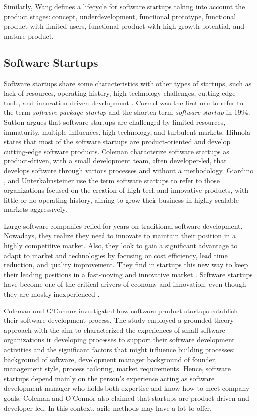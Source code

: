 \documentclass[runningheads]{llncs}
\begin{document}
Similarly, Wang \cite{wang2016key} defines a lifecycle for software startups taking into account the product stages: concept, underdevelopment, functional prototype, functional product with limited users, functional product with high growth potential, and mature product.

\subsection{Software Startups}

Software startups share some characteristics with other types of startups, such as lack of resources, operating history, high-technology challenges, cutting-edge tools, and innovation-driven development \cite{Unterkalmsteiner2016}. Carmel \cite{carmel1994time} was the first one to refer to the term \textit{software package startup} and the shorten term \textit{software startup} in 1994. Sutton \cite{sutton2000role} argues that software startups are challenged by limited resources, immaturity, multiple influences, high-technology, and turbulent markets. Hilmola \cite{hilmola2003value} states that most of the software startups are product-oriented and develop cutting-edge software products. Coleman \cite{coleman2008investigation} characterize software startups as product-driven, with a small development team, often developer-led, that develops software through various processes and without a methodology. Giardino \cite{Giardino2016}, and Unterkalmsteiner \cite{Unterkalmsteiner2016} use the term software startups to refer to those organizations focused on the creation of high-tech and innovative products, with little or no operating history, aiming to grow their business in highly-scalable markets aggressively. 

Large software companies relied for years on traditional software development. Nowadays, they realize they need to innovate to maintain their position in a highly competitive market. Also, they look to gain a significant advantage to adapt to market and technologies by focusing on cost efficiency, lead time reduction, and quality improvement. They find in startups this new way to keep their leading positions in a fast-moving and innovative market \cite{edison2018lean}. Software startups have become one of the critical drivers of economy and innovation, even though they are mostly inexperienced \cite{sutton2000role}. 

Coleman and O'Connor \cite{coleman2008investigation} investigated how software product startups establish their software development process. The study employed a grounded theory approach with the aim to characterized the experiences of small software organizations in developing processes to support their software development activities and the significant factors that might influence building processes: background of software, development manager background of founder, management style, process tailoring, market requirements. Hence, software startups depend mainly on the person's experience acting as software development manager who holds both expertise and know-how to meet company goals. Coleman and O'Connor \cite{coleman2008investigation} also claimed that startups are product-driven and developer-led. In this context, agile methods may have a lot to offer.
\end{document}
